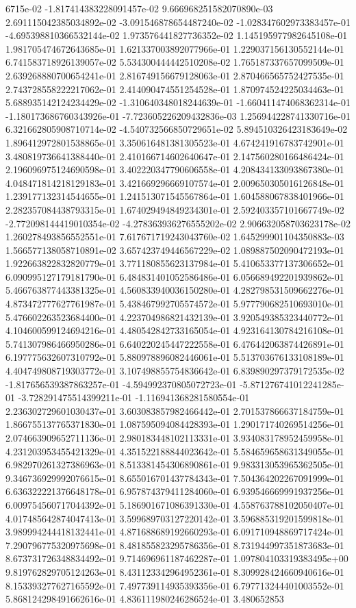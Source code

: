 6715e-02	-1.817414383228091457e-02	9.666968251582070890e-03	2.691115042385034892e-02	-3.091546878654487240e-02	-1.028347602973383457e-01	-4.695398810366532144e-02	1.973576441827736352e-02	1.145195977982645108e-01	1.981705474672643685e-01	1.621337003892077966e-01	1.229037156130552144e-01	6.741583718926139057e-02	5.534300444442510208e-02	1.765187337657099509e-01	2.639268880700654241e-01	2.816749156679128063e-01	2.870466565752427535e-01	2.743728558222217062e-01	2.414090474551254528e-01	1.870974524225034463e-01	5.688935142124234429e-02	-1.310640348018244639e-01	-1.660411474068362314e-01	-1.180173686760343926e-01	-7.723605226209432836e-03	1.256944228741330716e-01	6.321662805908710714e-02	-4.540732566850729651e-02	5.894510326423183649e-02	1.896412972801538865e-01	3.350616481381305523e-01	4.674241916783742901e-01	3.480819736641388440e-01	2.410166714602640647e-01	2.147560280166486424e-01	2.196096975124690598e-01	3.402220347790606558e-01	4.208434133093867380e-01	4.048471814218129183e-01	3.421669296669107574e-01	2.009650305016126848e-01	1.239177132314544655e-01	1.241513071545567864e-01	1.604588067838401966e-01	2.282357084438793315e-01	1.674029494849234301e-01	2.592403357101667749e-02	-2.772098144419010354e-02	-4.278363936276555202e-02	2.906632058703623178e-02	1.260278493856552551e-01	7.617671719243043760e-02	1.645299901104350883e-03	1.566577138058710891e-02	3.657423749446567229e-02	1.089887502090472193e-01	1.922663822832820779e-01	3.771180855623137984e-01	5.410653377137306652e-01	6.090995127179181790e-01	6.484831401052586486e-01	6.056689492201939862e-01	5.466763877443381325e-01	4.560833940036150280e-01	4.282798531509662276e-01	4.873472777627761987e-01	5.438467992705574572e-01	5.977790682510693010e-01	5.476602263523684400e-01	4.223704986821432139e-01	3.920549385323440772e-01	4.104600599124694216e-01	4.480542842733165054e-01	4.923164130784216108e-01	5.741307986466950286e-01	6.640220245447222558e-01	6.476442063874426891e-01	6.197775632607310792e-01	5.880978896082446061e-01	5.513703676133108189e-01	4.404749808719303772e-01	3.107498855754836642e-01	6.839890297379172535e-02	-1.817656539387863257e-01	-4.594992370805072723e-01	-5.871276741012241285e-01	-3.728291475514399211e-01	-1.116941368281580554e-01	2.236302729601030437e-01	3.603083857982466442e-01	2.701537866637184759e-01	1.866755137765371830e-01	1.087595094084428393e-01	1.290171740269514256e-01	2.074663909652711136e-01	2.980183448102113331e-01	3.934083178952459958e-01	4.231203953455421329e-01	4.351522188844023642e-01	5.584659658631349055e-01	6.982970261327386963e-01	8.513381454306890861e-01	9.983313053965362505e-01	9.346736929992076615e-01	8.655016701437784343e-01	7.504364202267091999e-01	6.636322221376648178e-01	6.957874379411284060e-01	6.939546669991937256e-01	6.009754560717044392e-01	5.186901671086391330e-01	4.558763788102050407e-01	4.017485642874047413e-01	3.599689703127220142e-01	3.596885319201599818e-01	3.989994244418132441e-01	4.871688689192660293e-01	6.091710948869717424e-01	7.290796775320975698e-01	8.481855823295786356e-01	8.731944997351873683e-01	8.673731726348834492e-01	9.714696961187462287e-01	1.097804103319383495e+00	9.819762829705124263e-01	8.431123342964952361e-01	8.309928424660940616e-01	8.153393277627165592e-01	7.497739114935393356e-01	6.797713244401003552e-01	5.868124298491662616e-01	4.836111980246286524e-01	3.480652853